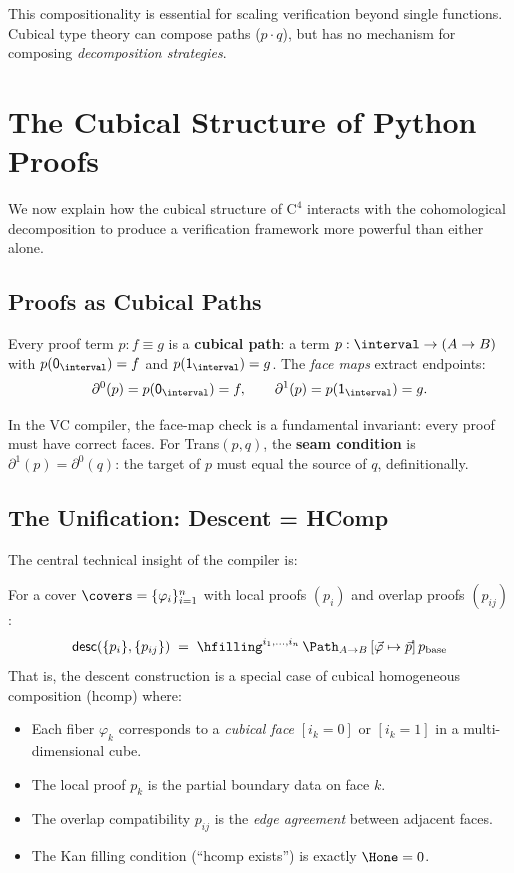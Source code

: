 This compositionality is essential for scaling verification
beyond single functions.  Cubical type theory can compose
paths ($p \cdot q$), but has no mechanism for composing
\emph{decomposition strategies}.


\section{The Cubical Structure of Python Proofs}
\label{sec:cubical-structure}

We now explain how the cubical structure of $\mathrm{C}^4$ interacts
with the cohomological decomposition to produce a verification
framework more powerful than either alone.


\subsection{Proofs as Cubical Paths}
\label{sec:proofs-paths}

Every proof term $p : f \equiv g$ is a \textbf{cubical path}:
a term $p : \interval \to (A \to B)$ with $p(\mathsf{0}_\interval) = f$
and $p(\mathsf{1}_\interval) = g$.  The \emph{face maps} extract
endpoints:
\[
  \partial^0(p) = p(\mathsf{0}_\interval) = f, \qquad
  \partial^1(p) = p(\mathsf{1}_\interval) = g.
\]

In the VC compiler, the face-map check is a fundamental invariant:
every proof must have correct faces.  For \textsf{Trans}$(p, q)$,
the \textbf{seam condition} is $\partial^1(p) = \partial^0(q)$:
the target of $p$ must equal the source of $q$, definitionally.


\subsection{The Unification: Descent = HComp}
\label{sec:descent-hcomp}

The central technical insight of the compiler is:

\begin{theorem}
\label{thm:descent-hcomp}
For a cover $\covers = \{\varphi_i\}_{i=1}^n$ with local proofs
$(p_i)$ and overlap proofs $(p_{ij})$:
\[
  \mathsf{desc}(\{p_i\}, \{p_{ij}\})
  \;=\;
  \hfilling^{i_1, \ldots, i_n}\,
  \Path_{A \to B}\,
  [\vec{\varphi} \mapsto \vec{p}]\,
  p_{\mathrm{base}}
\]
That is, the descent construction is a special case of
cubical homogeneous composition (\textsf{hcomp}) where:
\begin{itemize}
\item Each fiber $\varphi_k$ corresponds to a \emph{cubical face}
  $[i_k = 0]$ or $[i_k = 1]$ in a multi-dimensional cube.
\item The local proof $p_k$ is the partial boundary data on
  face $k$.
\item The overlap compatibility $p_{ij}$ is the \emph{edge agreement}
  between adjacent faces.
\item The Kan filling condition (``\textsf{hcomp} exists'')
  is exactly $\Hone = 0$.
\end{itemize}
\end{theorem}

